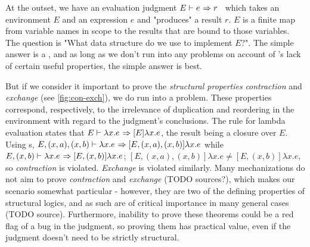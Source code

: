 \documentclass[nonacm]{acmart}
\theoremstyle{slplain}
\numberwithin{thm}{section}
\begin{document}
\newcommand{\eval}[3]{\ensuremath{{#1} \vdash {#2} \hspace{0.01in} \Rightarrow {#3}}}

At the outset, we have an evaluation judgment \eval{E}{e}{r}~ which takes an environment $E$ and an expression $e$
and "produces" a result $r$.
$E$ is a finite map from variable names in scope to the results that are bound to
those variables. The question is "What data structure do we use to implement $E$?". The simple answer is a \sal,
and as long as we don't run into any problems on account of \SAL's lack of certain useful properties, the simple
answer is best.

But if we consider it important to prove the \emph{structural properties} \emph{contraction}
and \emph{exchange} (see \autoref{fig:con-exch}), we do run into a problem. These properties correspond,
respectively, to the irrelevance of duplication and reordering in the environment with regard to the judgment's
conclusions. The rule for lambda evaluation states that \mbox{\eval{E}{\lambda x . e}{[E]\lambda x . e}}, the result
being a closure over $E$. Using {\SAL}s, \mbox{\eval{E, (x, a), (x, b)}{\lambda x . e}{[E, (x, a), (x, b)]\lambda x . e}}
while \mbox{\eval{E, (x, b)}{\lambda x . e}{[E, (x, b)]\lambda x . e}}; $[E, (x, a), (x, b)]\lambda x . e \ne
[E, (x, b)]\lambda x . e$, so \emph{contraction} is violated. \emph{Exchange} is violated similarly. Many mechanizations
do not aim to prove \emph{contraction} and \emph{exchange} (TODO sources?), which makes our scenario somewhat
particular - however, they are two of the defining properties of structural logics, and as such are of critical
importance in many general cases (TODO source). Furthermore, inability to prove these theorems could be a red flag
of a bug in the judgment, so proving them has practical value, even if the judgment doesn't need to be strictly
structural.

\end{document}
